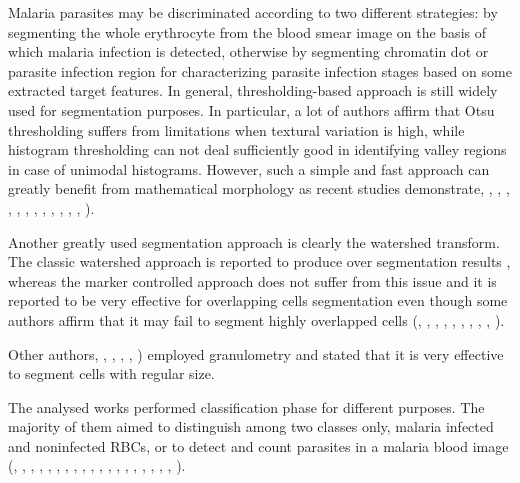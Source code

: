 \documentclass[sensors,review,submit,moreauthors,pdftex,10pt,a4paper]{mdpi}
\begin{document}
Malaria parasites may be discriminated according to two different strategies: by segmenting the whole erythrocyte from the blood smear image on the basis of which malaria infection is detected, otherwise by segmenting chromatin dot or parasite infection region for characterizing parasite infection stages based on some extracted target features.
In general, thresholding-based approach is still widely used for segmentation purposes. In particular, a lot of authors affirm that Otsu thresholding suffers from limitations when textural variation is high, while histogram thresholding can not deal sufficiently good in identifying valley regions in case of unimodal histograms. However, such a simple and fast approach can greatly benefit from mathematical morphology as recent studies demonstrate, \cite{Anggraini2011}, \cite{Arco2014}, \cite{DiRuberto2002}, \cite{Elter2011}, \cite{Ghosh2011},  \cite{Kareem2011}, \cite{Mushabe2013},  \cite{Rosado2017}, \cite{Ross2006}, \cite{Savkare2011b}, \cite{Savkare2015}, \cite{Somasekar2017}, \cite{Tek2010}).

Another greatly used segmentation approach is clearly the watershed transform. The classic watershed approach is reported to produce over segmentation results \cite{Savkare2011b}, whereas the marker controlled approach does not suffer from this issue and it is reported to be very effective for overlapping cells segmentation even though some authors affirm that it may fail to segment highly overlapped cells  (\cite{Das2011}, \cite{Das2013}, \cite{Das2014}, \cite{Das2015}, \cite{Devi2017}, \cite{Khan2011}, \cite{Romero2016}, \cite{Savkare2015}, \cite{Savkare2011a}, \cite{Springl2009}).

Other authors, \cite{DiRuberto2002}, \cite{Khan2011}, \cite{Mushabe2013}, \cite{Ross2006}, \cite{Tek2010}) employed granulometry and stated that it is very effective to segment cells with regular size.

The analysed works performed classification phase for different purposes. The majority of them aimed to distinguish among two classes only, malaria infected and noninfected RBCs, or to detect and count parasites in a malaria blood image (\cite{Anggraini2011}, \cite{Arco2014}, \cite{Das2011}, \cite{Dave2017}, \cite{Das2015}, \cite{DiRuberto2002}, \cite{Elter2011}, \cite{Ghosh2011}, \cite{Kareem2012}, \cite{Khan2014}, \cite{Malihi2013}, \cite{Mushabe2013}, \cite{Oliveira2017}, \cite{Savkare2011b}, \cite{Savkare2011a}, \cite{Somasekar2011}, \cite{Somasekar2015}, \cite{Somasekar2017}, \cite{Sulist2015}, \cite{Tek2006}).
\end{document}
